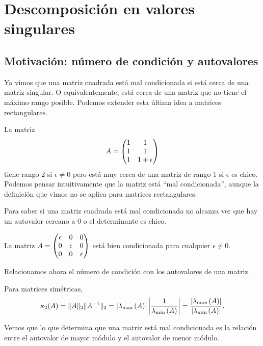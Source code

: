\chapter{Descomposición en valores singulares}

\section{Motivación: número de condición y autovalores}

Ya vimos que una matriz cuadrada está mal condicionada si está cerca de una matriz singular. O equivalentemente, está cerca de una matriz que no tiene el máximo rango posible. Podemos extender esta última idea a matrices rectangulares.

La matriz
$$
\Ab = \begin{pmatrix}
1 & 1 \\
1 & 1 \\
1 & 1+ \epsilon \end{pmatrix}
$$
tiene rango 2 si $\epsilon \neq 0$ pero está muy cerca de una matriz de rango 1 si $\epsilon$ es chico.
Podemos pensar intuitivamente que la matriz est\'a ``mal condicionada'', aunque la definición que vimos no se aplica para matrices rectangulares.

\begin{observacion} Para saber si una matriz cuadrada está mal condicionada no alcanza ver que hay un autovalor cercano a 0 o el determinante es chico.
\end{observacion}

\begin{ejemplo} La matriz
$
\Ab = \begin{pmatrix}
\epsilon & 0 & 0 \\
0 & \epsilon & 0 \\
0 & 0 & \epsilon
\end{pmatrix}
$
está bien condicionada para cualquier $\epsilon \neq 0$.
\end{ejemplo}


Relacionamos ahora el número de condición con los autovalores de una matriz.

Para matrices simétricas,
$$
\kappa_2(\Ab) = \|\Ab\|_2 \|\Ab^{-1}\|_2 = |\lambda_{\max{}}(\Ab)| \left|\frac{1}{\lambda_{\min{}}(\Ab)}\right| = \frac{|\lambda_{\max{}}(\Ab)|}{|\lambda_{\min{}}(\Ab)|}.
$$

Vemos que lo que determina que una matriz está mal condicionada es la relación entre el autovalor de mayor módulo y el autovalor de menor módulo.
